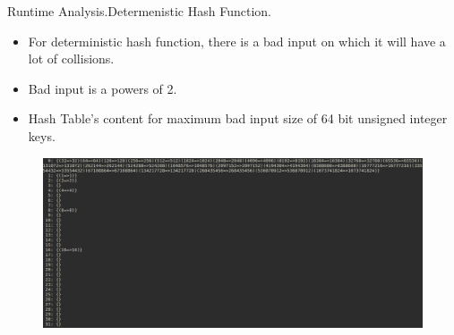 \documentclass{beamer}
\begin{document}

\begin{frame}{Runtime Analysis.}{Determenistic Hash Function.}
  \begin{itemize}
  \item For deterministic hash function, there is a bad input on which it will have a lot of collisions.
  \item Bad input is a powers of 2.
  \item Hash Table's content for maximum bad input size of 64 bit unsigned integer keys. 
  \end{itemize}
  \begin{figure}
    \includegraphics[scale=0.3]{worst_uint64_t_input}
  \end{figure}
\end{frame}
\end{document}

